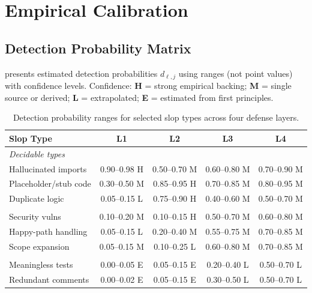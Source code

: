 \documentclass[11pt, a4paper, copyright]{googledeepmind}
\begin{document}
\section{Empirical Calibration}
\label{sec:calibration}

\subsection{Detection Probability Matrix}

 presents estimated detection probabilities $d_{\ell,j}$ using ranges (not point values) with confidence levels. Confidence: \textbf{H} = strong empirical backing; \textbf{M} = single source or derived; \textbf{L} = extrapolated; \textbf{E} = estimated from first principles.

\begin{table}[htbp]
\centering
\caption{Detection probability ranges for selected slop types across four defense layers.}
\label{tab:detection}
\small
\begin{tabular}{@{}l c c c c@{}}
\toprule
\textbf{Slop Type} & \textbf{L1} & \textbf{L2} & \textbf{L3} & \textbf{L4} \\
\midrule
\multicolumn{5}{l}{\textit{Decidable types}} \\
\addlinespace
Hallucinated imports & 0.90--0.98 H & 0.50--0.70 M & 0.60--0.80 M & 0.70--0.90 M \\
Placeholder/stub code & 0.30--0.50 M & 0.85--0.95 H & 0.70--0.85 M & 0.80--0.95 M \\
Duplicate logic & 0.05--0.15 L & 0.75--0.90 H & 0.40--0.60 M & 0.50--0.70 M \\
\addlinespace
\multicolumn{5}{l}{\textit{Semi-decidable types}} \\
\addlinespace
Security vulns & 0.10--0.20 M & 0.10--0.15 H & 0.50--0.70 M & 0.60--0.80 M \\
Happy-path handling & 0.05--0.15 L & 0.20--0.40 M & 0.55--0.75 M & 0.70--0.85 M \\
Scope expansion & 0.05--0.15 M & 0.10--0.25 L & 0.60--0.80 M & 0.70--0.85 M \\
\addlinespace
\multicolumn{5}{l}{\textit{Undecidable types}} \\
\addlinespace
Meaningless tests & 0.00--0.05 E & 0.05--0.15 E & 0.20--0.40 L & 0.50--0.70 L \\
Redundant comments & 0.00--0.02 E & 0.05--0.15 E & 0.30--0.50 L & 0.50--0.70 L \\
\bottomrule
\end{tabular}
\end{table}
\end{document}
